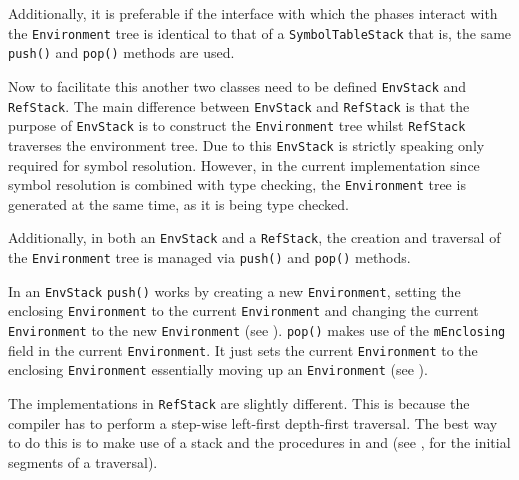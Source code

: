 Additionally, it is preferable if the interface with which the
phases interact with the \texttt{Environment} tree is identical
to that of a \texttt{SymbolTableStack} that is, the same
\texttt{push()} and \texttt{pop()} methods are used.

Now to facilitate this another two classes need to be defined
\texttt{EnvStack} and \\ \texttt{RefStack}. The main difference
between \texttt{EnvStack} and \texttt{RefStack} is that the
purpose of \texttt{EnvStack} is to construct the
\texttt{Environment} tree whilst \texttt{RefStack} traverses the
environment tree. Due to this \texttt{EnvStack} is strictly
speaking only required for symbol resolution. However, in the
current implementation since symbol resolution is combined with
type checking, the \texttt{Environment} tree is generated at the
same time, as it is being type checked.

Additionally, in both an \texttt{EnvStack} and a
\texttt{RefStack}, the creation and traversal of the
\texttt{Environment} tree is managed via \texttt{push()} and
\texttt{pop()} methods.

In an \texttt{EnvStack} \texttt{push()} works by creating a new
\texttt{Environment}, setting the enclosing \texttt{Environment}
to the current \texttt{Environment} and changing the current
\texttt{Environment} to the new \texttt{Environment} (see
). \texttt{pop()} makes use of the
\texttt{mEnclosing} field in the current \texttt{Environment}. It just
sets the current \texttt{Environment} to the enclosing \texttt{Environment}
essentially moving up an \texttt{Environment} (see ).





The implementations in \texttt{RefStack} are slightly different.
This is because the compiler has to perform a step-wise
left-first depth-first traversal. The best way to do this is to
make use of a stack and the procedures in  and
 (see , for the initial
segments of a traversal).



